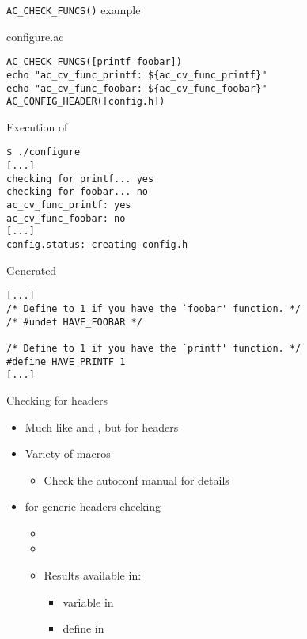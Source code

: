 \begin{frame}[fragile]{{\tt AC\_CHECK\_FUNCS()} example}

\begin{block}{configure.ac}
\begin{verbatim}
AC_CHECK_FUNCS([printf foobar])
echo "ac_cv_func_printf: ${ac_cv_func_printf}"
echo "ac_cv_func_foobar: ${ac_cv_func_foobar}"
AC_CONFIG_HEADER([config.h])
\end{verbatim}
\end{block}

\begin{block}{Execution of }
\begin{verbatim}
$ ./configure
[...]
checking for printf... yes
checking for foobar... no
ac_cv_func_printf: yes
ac_cv_func_foobar: no
[...]
config.status: creating config.h
\end{verbatim}
\end{block}

\begin{block}{Generated }
\begin{verbatim}
[...]
/* Define to 1 if you have the `foobar' function. */
/* #undef HAVE_FOOBAR */

/* Define to 1 if you have the `printf' function. */
#define HAVE_PRINTF 1
[...]
\end{verbatim}
\end{block}

\end{frame}

\begin{frame}{Checking for headers}

  \begin{itemize}
  \item Much like  and , but for headers
  \item Variety of  macros
    \begin{itemize}
    \item Check the autoconf manual for details
    \end{itemize}
  \item {} for generic headers checking
    \begin{itemize}
    \item {}
    \item {}
    \item Results available in:
      \begin{itemize}
      \item {} variable in
      \item {} define in 
      \end{itemize}
    \end{itemize}
  \end{itemize}
\end{frame}

